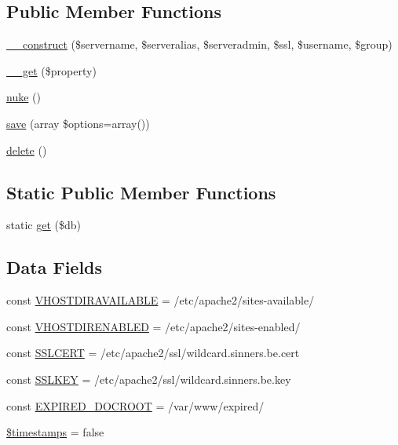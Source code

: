 \subsection*{Public Member Functions}
\begin{DoxyCompactItemize}
\item 
\hyperlink{class_apache_vhost_virtual_a8798f16390a6e47a5c51e544bfd504c4}{\+\_\+\+\_\+construct} (\$servername, \$serveralias, \$serveradmin, \$ssl, \$username, \$group)
\item 
\hyperlink{class_apache_vhost_virtual_a6481e8cfc93c80885b3d72a6e1f15a1f}{\+\_\+\+\_\+get} (\$property)
\item 
\hyperlink{class_apache_vhost_virtual_a49d378e59da603cc1f24b56165f59c99}{nuke} ()
\item 
\hyperlink{class_apache_vhost_virtual_a1797aabe2d51bfaed969f89ba6709be5}{save} (array \$options=array())
\item 
\hyperlink{class_apache_vhost_virtual_a13bdffdd926f26b825ea57066334ff01}{delete} ()
\end{DoxyCompactItemize}
\subsection*{Static Public Member Functions}
\begin{DoxyCompactItemize}
\item 
static \hyperlink{class_apache_vhost_virtual_aebdfa979f8604b14742945bb8b157abb}{get} (\$db)
\end{DoxyCompactItemize}
\subsection*{Data Fields}
\begin{DoxyCompactItemize}
\item 
const \hyperlink{class_apache_vhost_virtual_a2c10c3a25379df4abad5d72bd9d8f50a}{V\+H\+O\+S\+T\+D\+I\+R\+A\+V\+A\+I\+L\+A\+B\+L\+E} = \textquotesingle{}/etc/apache2/sites-\/available/\textquotesingle{}
\item 
const \hyperlink{class_apache_vhost_virtual_a1a4b4a177c5f641247122bc087354252}{V\+H\+O\+S\+T\+D\+I\+R\+E\+N\+A\+B\+L\+E\+D} = \textquotesingle{}/etc/apache2/sites-\/enabled/\textquotesingle{}
\item 
const \hyperlink{class_apache_vhost_virtual_a2224f5b00858d8cb8912ac081e75147d}{S\+S\+L\+C\+E\+R\+T} = \textquotesingle{}/etc/apache2/ssl/wildcard.\+sinners.\+be.\+cert\textquotesingle{}
\item 
const \hyperlink{class_apache_vhost_virtual_a7b1e46a23212d17b643043b53586fd41}{S\+S\+L\+K\+E\+Y} = \textquotesingle{}/etc/apache2/ssl/wildcard.\+sinners.\+be.\+key\textquotesingle{}
\item 
const \hyperlink{class_apache_vhost_virtual_a2ee313338f2f36814d5c7c3233a6f517}{E\+X\+P\+I\+R\+E\+D\+\_\+\+D\+O\+C\+R\+O\+O\+T} = \textquotesingle{}/var/www/expired/\textquotesingle{}
\item 
\hyperlink{class_apache_vhost_virtual_a51267c24c8fae742ed8f9be0ba6085ee}{\$timestamps} = false
\end{DoxyCompactItemize}
